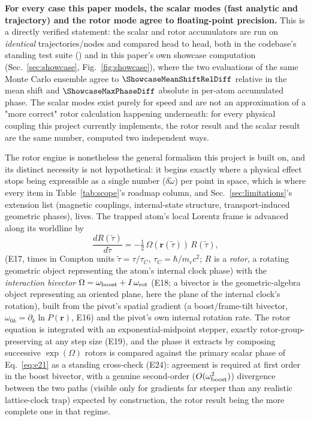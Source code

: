 \documentclass[aps,pra,superscriptaddress,groupedaddress,nofootinbib]{revtex4-2}
\begin{document}
\textbf{For every case this paper models, the scalar modes (fast analytic
and trajectory) and the rotor mode agree to floating-point precision.}
This is a directly verified statement: the scalar and
rotor accumulators are run on \emph{identical} trajectories/nodes and
compared head to head, both in the codebase's standing test suite
() and in this paper's own
showcase computation (Sec.~\ref{sec:showcase}, Fig.~\ref{fig:showcase}),
where the two evaluations of the same Monte Carlo ensemble agree to
$\ShowcaseMeanShiftRelDiff$ relative in the mean shift and
$\ShowcaseMaxPhaseDiff$ absolute in per-atom accumulated phase. The
scalar modes exist purely for speed and are not an approximation of a
"more correct" rotor calculation happening underneath: for every physical
coupling this project currently implements, the rotor result and the
scalar result are the same number, computed two independent ways.

The rotor engine is nonetheless the general formalism this project is
built on, and its distinct necessity is not hypothetical: it begins
exactly where a physical effect stops being expressible as a single
number ($\delta\tilde\omega$) per point in space, which is where every
item in Table~\ref{tab:scope}'s roadmap column, and Sec.~\ref{sec:limitations}'s
extension list (magnetic couplings, internal-state structure,
transport-induced geometric phases), lives. The trapped atom's local
Lorentz frame is advanced along its worldline by
\begin{equation}
  \frac{dR(\tilde\tau)}{d\tilde\tau} = -\tfrac12\,\Omega(\mathbf{r}(\tilde\tau))\,R(\tilde\tau) ,
  \label{eq:e17}
\end{equation}
(E17, times in Compton units $\tilde\tau=\tau/\tau_C$,
$\tau_C=\hbar/m_ec^2$; $R$ is a \emph{rotor}, a rotating geometric
object representing the atom's internal clock phase) with the
\emph{interaction bivector} $\Omega = \omega_{\rm boost} + I\,\omega_{\rm
rot}$ (E18; a bivector is the geometric-algebra object representing an
oriented plane, here the plane of the internal clock's rotation), built
from the pivot's spatial gradient (a boost/frame-tilt bivector,
$\omega_{0k}=\partial_k\ln P(\mathbf{r})$, E16) and the pivot's own
internal rotation rate. The rotor equation is integrated with an
exponential-midpoint stepper, exactly rotor-group-preserving at any step
size (E19), and the phase it extracts by composing successive
$\exp(\Omega)$ rotors is compared against the primary scalar phase of
Eq.~\eqref{eq:e21} as a standing cross-check (E24): agreement is required
at first order in the boost bivector, with a genuine second-order
($O(\omega_{\rm boost}^2)$) divergence between the two paths (visible
only for gradients far steeper than any realistic lattice-clock trap)
expected by construction, the rotor result being the more complete one
in that regime.
\end{document}

